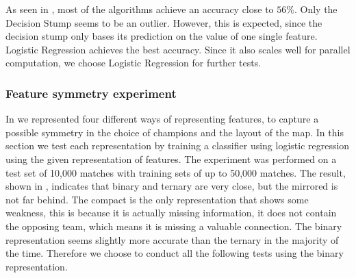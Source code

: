 As seen in , most of the algorithms achieve an accuracy close to $56 \%$. Only the Decision Stump seems to be an outlier. However, this is expected, since the decision stump only bases its prediction on the value of one single feature.
Logistic Regression achieves the best accuracy. Since it also scales well for parallel computation, we choose Logistic Regression for further tests.

\subsubsection{Feature symmetry experiment}
In  we represented four different ways of representing features, to capture a possible symmetry in the choice of champions and the layout of the map. In this section we test each representation by training a classifier using logistic regression using the given representation of features. The experiment was performed on a test set of 10,000 matches with training sets of up to 50,000 matches. The result, shown in , indicates that binary and ternary are very close, but the mirrored is not far behind. The compact is the only representation that shows some weakness, this is because it is actually missing information, it does not contain the opposing team, which means it is missing a valuable connection. The binary representation seems slightly more accurate than the ternary in the majority of the time. Therefore we choose to conduct all the following tests using the binary representation. 

